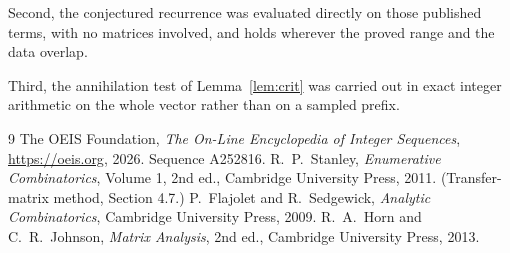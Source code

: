 \documentclass[11pt,a4paper]{article}
\theoremstyle{plain}
\theoremstyle{definition}
\begin{document}
Second, the conjectured recurrence was evaluated directly on those published terms, with no
matrices involved, and holds wherever the proved range and the data overlap.

Third, the annihilation test of Lemma~\ref{lem:crit} was carried out in exact integer
arithmetic on the whole vector rather than on a sampled prefix.

\begin{thebibliography}{9}
 The OEIS Foundation, \emph{The On-Line Encyclopedia of Integer
Sequences}, \url{https://oeis.org}, 2026. Sequence A252816.
 R.~P.~Stanley, \emph{Enumerative Combinatorics}, Volume 1, 2nd ed.,
Cambridge University Press, 2011. (Transfer-matrix method, Section 4.7.)
 P.~Flajolet and R.~Sedgewick, \emph{Analytic Combinatorics}, Cambridge
University Press, 2009.
 R.~A.~Horn and C.~R.~Johnson, \emph{Matrix Analysis}, 2nd ed., Cambridge
University Press, 2013.
\end{thebibliography}
\end{document}

